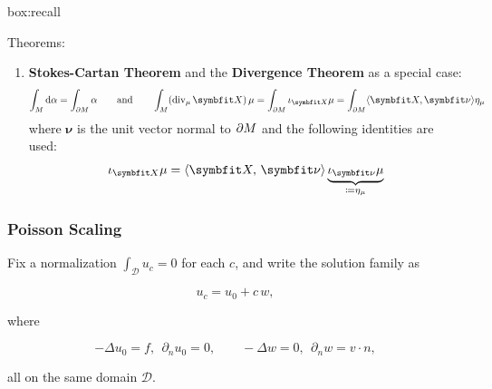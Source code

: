 \begin{ambox}{box:recall}
{Theorems:
\begin{enumerate}
\item \textbf{Stokes-Cartan Theorem}
and the \textbf{Divergence Theorem} as a special case:
\begin{equation}
\int_{\PlaneManifold} \dd \alpha = \int_{\PlaneBoundary} \alpha
\qquad\text{and}\qquad
\int_{\PlaneManifold} (\operatorname{div}_{\mu} \bm{X}) \, \mu = \int_{\PlaneBoundary} \interior{\bm{X}}{\mu}
= \int_{\PlaneBoundary}\langle \bm{X}, \bm{\nu}\rangle \eta_{\mu}
\label{eq:gauss-div-thm}
\end{equation}
where $\bm{\nu}$ is the unit vector normal to $\partial M$ and the following identities are used:
$$
\interior{\bm{X}}{\mu} = \langle \bm{X},\, \bm{\nu}\rangle \underbrace{\interior{\bm{\nu}}{\mu}}_{\coloneq \eta_{\mu}}
$$
\end{enumerate}
}
\end{ambox}


%
%
%

\iffalse
\subsubsection{Poisson Scaling}
Fix a normalization $\int_{\mathscr D} u_c=0$ for each $c$, and write the solution family as

$$
u_c = u_0 + c\,w,
$$

where

$$
-\Delta u_0=f,\ \ \partial_n u_0=0,\qquad
-\Delta w=0,\ \ \partial_n w=v\!\cdot n,
$$

all on the same domain $\mathscr D$.

